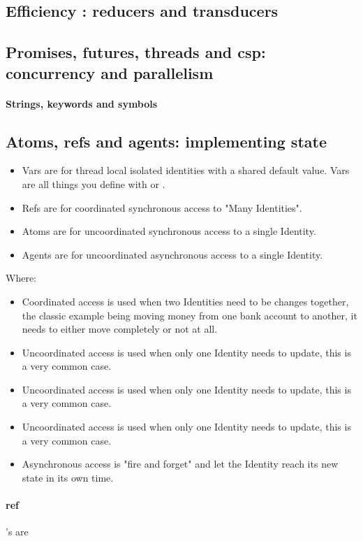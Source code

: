 \subsection{Efficiency : reducers and transducers}


\subsection{Promises, futures, threads and csp: concurrency and parallelism}

\paragraph{Strings, keywords and symbols}


\subsection{Atoms, refs and agents: implementing state}



\begin{itemize}
    \item Vars are for thread local isolated identities with a shared default value. Vars are all things you define with  or .
    \item Refs are for coordinated synchronous access to "Many Identities".
    \item Atoms are for uncoordinated synchronous access to a single Identity.
    \item Agents are for uncoordinated asynchronous access to a single Identity.
\end{itemize}

Where: 

\begin{itemize}
    \item Coordinated access is used when two Identities need to be changes together, the classic example being moving money from one bank account to another, it needs to either move completely or not at all.
    \item Uncoordinated access is used when only one Identity needs to update, this is a very common case.
    \item Uncoordinated access is used when only one Identity needs to update, this is a very common case.
    \item Uncoordinated access is used when only one Identity needs to update, this is a very common case.
    \item Asynchronous access is "fire and forget" and let the Identity reach its new state in its own time.
\end{itemize}


\paragraph{ref}'s are 


